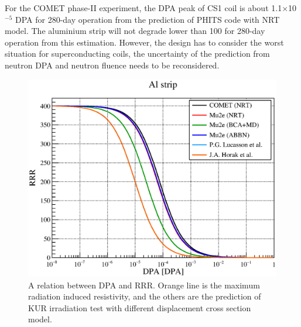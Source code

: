 For the COMET phase-II experiment, the DPA peak of CS1 coil is about 1.1$\times$10$^{-5}$ DPA for 280-day operation from the prediction of PHITS code with NRT model.
The aluminium strip will not degrade lower than 100 for 280-day operation from this estimation.
However, the design has to consider the worst situation for superconducting coils, the uncertainty of the prediction from neutron DPA and neutron fluence needs to be reconsidered.
\begin{figure}[H]
 \centering
 \includegraphics[scale=0.5]{chapter4/fig/dpadegradation.eps}
 \caption{A relation between DPA and RRR. Orange line is the maximum radiation induced resistivity, and the others are the prediction of KUR irradiation test with different displacement cross section model.}
 \label{dpaaa}
\end{figure}
